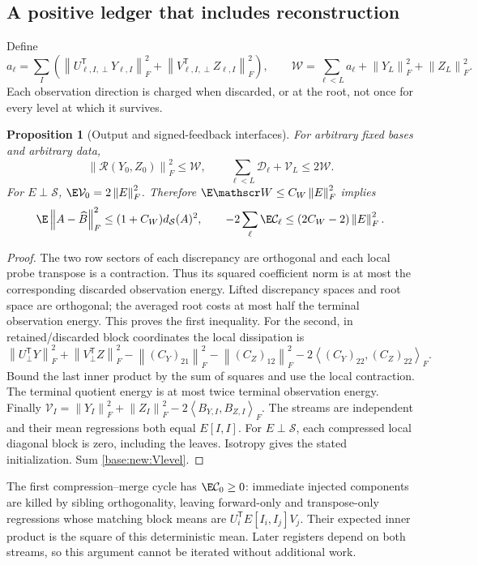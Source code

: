 \documentclass[11pt,oneside,openany,a4paper]{book}
\numberwithin{equation}{chapter}
\newtheorem{proposition}[theorem]{Proposition}
\theoremstyle{definition}
\theoremstyle{remark}
\newcommand{\T}{\mathsf T}\newcommand{\Id}{I}
\newcommand{\F}[1]{\left\lVert#1\right\rVert_F}
\newcommand{\ip}[2]{\left\langle#1,#2\right\rangle_F}
\begin{document}
\subsection{A positive ledger that includes reconstruction}
Define
\[
 a_\ell=\sum_I\left(\F{U_{\ell,I,\perp}^\T Y_{\ell,I}}^2+
 \F{V_{\ell,I,\perp}^\T Z_{\ell,I}}^2\right),\qquad
 \mathscr W=\sum_{\ell<L}a_\ell+\F{Y_L}^2+\F{Z_L}^2.
\]
Each observation direction is charged when discarded, or at the root, not once for every level at which it survives.
\begin{proposition}[Output and signed-feedback interfaces]\label{base:new:ledger-interface}
For arbitrary fixed bases and arbitrary data,
\[
 \F{\mathcal R(Y_0,Z_0)}^2\le\mathscr W,\qquad
 \sum_{\ell<L}\mathcal D_\ell+\mathcal V_L\le2\mathscr W.
\]
For $E\perp\mathcal S$, $\E\mathcal V_0=2\F E^2$. Therefore $\E\mathscr W\le C_W\F E^2$ implies
\[
 \E\F{A-\widehat B}^2\le(1+C_W)d_{\mathcal S}(A)^2,\qquad
 -2\sum_\ell\E\mathcal C_\ell\le(2C_W-2)\F E^2.
\]
\end{proposition}
\begin{proof}
The two row sectors of each discrepancy are orthogonal and each local probe transpose is a contraction. Thus its squared coefficient norm is at most the corresponding discarded observation energy. Lifted discrepancy spaces and root space are orthogonal; the averaged root costs at most half the terminal observation energy. This proves the first inequality.
For the second, in retained/discarded block coordinates the local dissipation is
\[
 \F{U_\perp^\T Y}^2+\F{V_\perp^\T Z}^2-
 \F{(C_Y)_{21}}^2-\F{(C_Z)_{12}}^2
 -2\ip{(C_Y)_{22}}{(C_Z)_{22}}.
\]
Bound the last inner product by the sum of squares and use the local contraction. The terminal quotient energy is at most twice terminal observation energy. Finally
$\mathcal V_I=\F{Y_I}^2+\F{Z_I}^2-2\ip{B_{Y,I}}{B_{Z,I}}$.
The streams are independent and their mean regressions both equal $E[I,I]$. For $E\perp\mathcal S$, each compressed local diagonal block is zero, including the leaves. Isotropy gives the stated initialization. Sum \eqref{base:new:Vlevel}.
\end{proof}
The first compression--merge cycle has $\E\mathcal C_0\ge0$: immediate injected components are killed by sibling orthogonality, leaving forward-only and transpose-only regressions whose matching block means are $U_i^\T E[I_i,I_j]V_j$. Their expected inner product is the square of this deterministic mean. Later registers depend on both streams, so this argument cannot be iterated without additional work.
\end{document}
